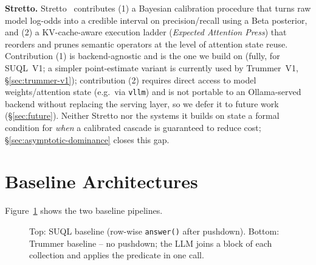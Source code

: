 \documentclass[sigconf,natbib=false]{acmart}
\begin{document}
\textbf{Stretto.} Stretto~\cite{stretto} contributes (1) a Bayesian calibration procedure that turns raw model log-odds into a credible interval on precision/recall using a Beta posterior, and (2) a KV-cache-aware execution ladder (\emph{Expected Attention Press}) that reorders and prunes semantic operators at the level of attention state reuse. Contribution (1) is backend-agnostic and is the one we build on (fully, for SUQL~V1; a simpler point-estimate variant is currently used by Trummer~V1, \S\ref{sec:trummer-v1}); contribution (2) requires direct access to model weights/attention state (e.g.\ via \texttt{vllm}) and is not portable to an Ollama-served backend without replacing the serving layer, so we defer it to future work (\S\ref{sec:future}). Neither Stretto nor the systems it builds on state a formal condition for \emph{when} a calibrated cascade is guaranteed to reduce cost; \S\ref{sec:asymptotic-dominance} closes this gap.

\section{Baseline Architectures}
\label{sec:baselines}

Figure~\ref{fig:baselines} shows the two baseline pipelines.

\begin{figure}[t]
\centering
{}
\caption{Top: SUQL baseline (row-wise \texttt{answer()} after pushdown). Bottom: Trummer baseline -- no pushdown; the LLM joins a block of each collection and applies the predicate in one call.}
\label{fig:baselines}
\end{figure}
\end{document}
